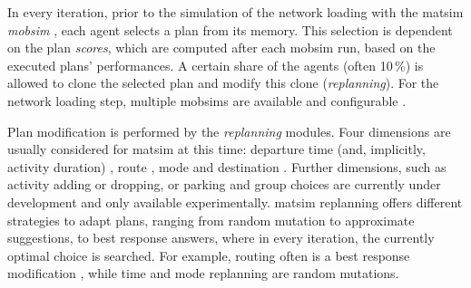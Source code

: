 In every iteration, prior to the simulation of the network loading with the \gls{matsim} \emph{\gls{mobsim}} \citep[e.g.,][]{Cetin_PhDThesis_2005}, each agent selects a plan from its memory. This selection is dependent on the plan \emph{scores}, which are computed after each mobsim run, based on the executed plans' performances. A certain share of the agents 
(often 10\,\%) is allowed to clone the selected plan and modify this clone (\emph{\gls{replanning}}).
For the network loading 
step, multiple \glspl{mobsim} are available and configurable \citep[][p.10f]{HorniEtAl_TechRep_IVT_2011_a, MATSim_Userguide_2015}. 

Plan modification is performed by the \emph{replanning} modules. Four dimensions are usually considered for \gls{matsim} at this time: departure time (and, implicitly, activity duration) \citep[][]{BalmerRaneyEtAl2005act-times}, route \citep[]{LefebvreBalmer_STRC_2007}, mode \citep{GretherEtAl2009SimpleModeChoiceIPL} and destination \citep{HorniEtc2008locachoice,HorniEtAl_unpub_TRB_2012}. Further dimensions, such as activity adding or dropping, or parking and group choices are currently under development and only available experimentally. %
\gls{matsim} replanning offers different strategies to adapt plans, ranging from random mutation to approximate suggestions, to best response answers, where in every iteration, the currently optimal choice is searched. For example, routing
often is a best response modification%
, while time and mode replanning are random mutations.

